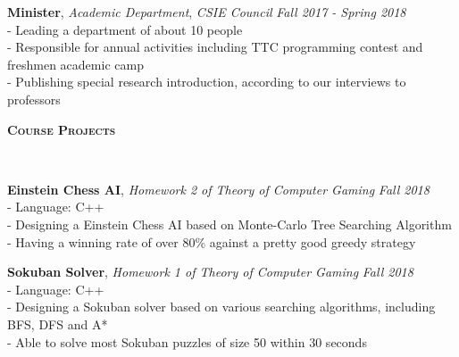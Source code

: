 \documentclass[10pt]{article}
\newenvironment{changemargin}[2]{%
  \begin{list}{}{%
    \setlength{\topsep}{0pt}%
    \setlength{\leftmargin}{#1}%
    \setlength{\rightmargin}{#2}%
    \setlength{\listparindent}{\parindent}%
    \setlength{\itemindent}{\parindent}%
    \setlength{\parsep}{\parskip}%
  }%
  \item[]}{\end{list}
}
\newcommand{\lineover}{
	\begin{changemargin}{-0.05in}{-0.05in}
		\vspace*{-8pt}
		\hrulefill \\
		\vspace*{-2pt}
	\end{changemargin}
}
\newcommand{\header}[1]{
	\begin{changemargin}{-0.5in}{-0.5in}
		\large{\bf \scshape{#1}}\\
  	\lineover
	\end{changemargin}
}
\newenvironment{body} {
	\vspace*{-16pt}
	\begin{changemargin}{-0.25in}{-0.5in}
  }	
	{\end{changemargin}
}
\begin{document}
\begin{body}
	\vspace{14pt}

	\textbf {Minister}, \textit{Academic Department}, \emph{CSIE Council} \hfill \emph{Fall 2017 - Spring 2018}\\
	    \hspace{12pt} - Leading a department of about 10 people\\
	    \hspace{12pt} - Responsible for annual activities including TTC programming contest and freshmen academic camp\\
	    \hspace{12pt} - Publishing special research introduction, according to our interviews to professors\\
	\smallskip
	
\end{body}

\smallskip



\header{Course Projects}

\begin{body}
	\vspace{14pt}

	\textbf {Einstein Chess AI}, \textit{Homework 2 of Theory of Computer Gaming} \hfill \emph{Fall 2018}\\
	\smallskip
        \hspace{12pt} - Language: C++\\
	    \hspace{12pt} - Designing a Einstein Chess AI based on Monte-Carlo Tree Searching Algorithm \\
	    \hspace{12pt} - Having a winning rate of over 80\% against a pretty good greedy strategy \\
	\smallskip

	
	\textbf {Sokuban Solver}, \textit{Homework 1 of Theory of Computer Gaming} \hfill \emph{Fall 2018}\\
	\smallskip
        \hspace{12pt} - Language: C++\\
		\hspace{12pt} - Designing a Sokuban solver based on various searching algorithms, including BFS, DFS and A*\\
		\hspace{12pt} - Able to solve most Sokuban puzzles of size 50 within 30 seconds
	\smallskip
	
	
\end{body}
\end{document}
